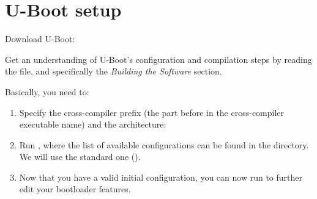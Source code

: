 \section{U-Boot setup}

Download U-Boot:


Get an understanding of U-Boot's configuration and compilation steps
by reading the  file, and specifically the {\em Building
the Software} section.

Basically, you need to:

\begin{enumerate}

\item Specify the cross-compiler prefix
(the part before  in the cross-compiler executable name) and the architecture:

\item Run , where the list of available
  configurations can be found in the  directory. We will use the standard one
  ().

\item Now that you have a valid initial configuration, you can now
  run  to further edit your bootloader features.

  \begin{itemize}


\end{itemize}
\end{enumerate}
